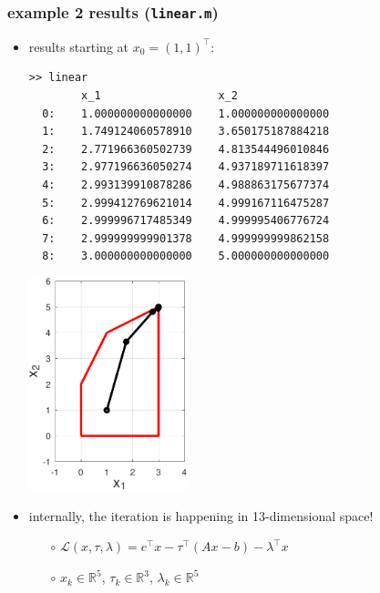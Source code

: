 \documentclass[10pt,hyperref,dvipsnames]{beamer}
\newcommand{\RR}{\mathbb{R}}
\begin{document}
\begin{frame}[fragile]
\frametitle{example 2 results (\texttt{linear.m})}

\begin{itemize}
\item results starting at $x_0=(1,1)^\top$:

\bigskip
\begin{Verbatim}[fontsize=\tiny]
>> linear
        x_1                  x_2
  0:    1.000000000000000    1.000000000000000
  1:    1.749124060578910    3.650175187884218
  2:    2.771966360502739    4.813544496010846
  3:    2.977196636050274    4.937189711618397
  4:    2.993139910878286    4.988863175677374
  5:    2.999412769621014    4.999167116475287
  6:    2.999996717485349    4.999995406776724
  7:    2.999999999901378    4.999999999862158
  8:    3.000000000000000    5.000000000000000
\end{Verbatim}

\vspace{-31mm}
\hfill \includegraphics[width=0.36\textwidth]{figs/linear.pdf}

\item internally, the iteration is happening in 13-dimensional space!
    \begin{itemize}
    \item[$\circ$] $\mathcal{L}(x,\tau,\lambda) = c^\top x - \tau^\top (Ax - b) - \lambda^\top x$
    \item[$\circ$] $x_k \in \RR^5$, \quad $\tau_k \in \RR^3$, \quad $\lambda_k \in \RR^5$
    \end{itemize}
\end{itemize}
\end{frame}
\end{document}
